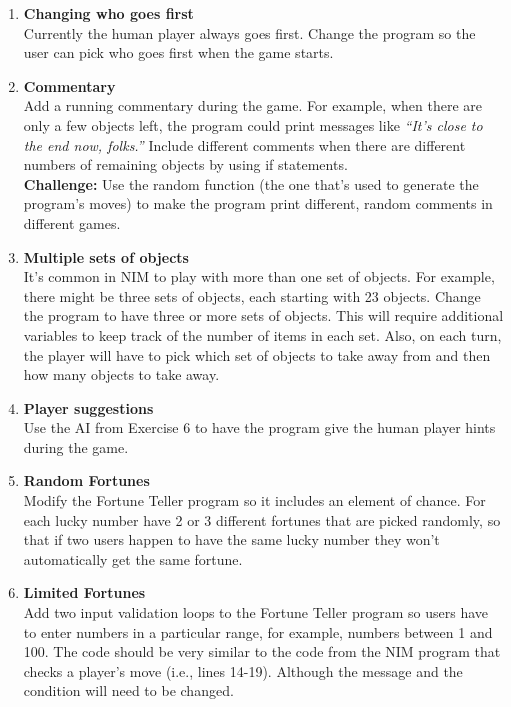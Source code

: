 \begin{enumerate}[{\bf 1.}]
\item {\bf Changing who goes first}\\ Currently the human player always goes first.  Change the program so the user can pick who goes first when the game starts.

\item {\bf Commentary}\\ Add a running commentary during the game.  For example, when there are only a few objects left, the program could print messages like \emph{``It's close to the end now, folks.''}   Include different comments when there are different numbers of remaining objects by using if statements. \\
 {\bf Challenge:} Use the random function (the one that's used to generate the program's moves) to make the program print different, random comments in different games.

\item {\bf Multiple sets of objects}\\  It's common in NIM to play with more than one set of objects.  For example, there might be three sets of objects, each starting with 23 objects.  Change the program to have three or more sets of objects.  This will require additional variables to keep track of the number of items in each set.  Also, on each turn, the player will have to pick which set of objects to take away from and then how many objects to take away.

\item {\bf Player suggestions}\\  Use the AI from Exercise 6 to have the program give the human player hints during the game.

\item {\bf Random Fortunes}\\  Modify the Fortune Teller program so it includes an element of chance.  For each lucky number have 2 or 3 different fortunes that are picked randomly, so that if two users happen to have the same lucky number they won't automatically get the same fortune.

\item {\bf Limited Fortunes}\\ Add two input validation loops to the Fortune Teller program so users have to enter numbers in a particular range, for example, numbers between 1 and 100.  The code should be very similar to the code from the NIM program that checks a player's move (i.e., lines 14-19).  Although the message and the condition will need to be changed.


\end{enumerate}
